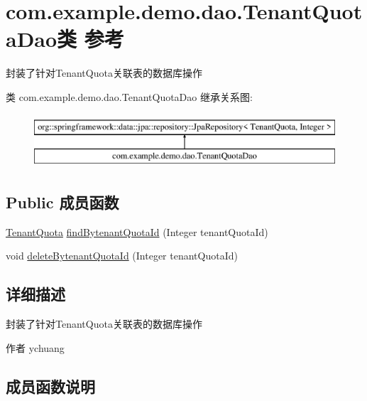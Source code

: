 \hypertarget{interfacecom_1_1example_1_1demo_1_1dao_1_1_tenant_quota_dao}{}\section{com.\+example.\+demo.\+dao.\+Tenant\+Quota\+Dao类 参考}
\label{interfacecom_1_1example_1_1demo_1_1dao_1_1_tenant_quota_dao}


封装了针对\+Tenant\+Quota关联表的数据库操作  


类 com.\+example.\+demo.\+dao.\+Tenant\+Quota\+Dao 继承关系图\+:\begin{figure}[H]
\begin{center}
\leavevmode
\includegraphics[height=2.000000cm]{interfacecom_1_1example_1_1demo_1_1dao_1_1_tenant_quota_dao}
\end{center}
\end{figure}
\subsection*{Public 成员函数}
\begin{DoxyCompactItemize}
\item 
\mbox{\hyperlink{classcom_1_1example_1_1demo_1_1modular_1_1_tenant_quota}{Tenant\+Quota}} \mbox{\hyperlink{interfacecom_1_1example_1_1demo_1_1dao_1_1_tenant_quota_dao_aae1ac7a929208d43ec54702caf4937e8}{find\+Bytenant\+Quota\+Id}} (Integer tenant\+Quota\+Id)
\item 
void \mbox{\hyperlink{interfacecom_1_1example_1_1demo_1_1dao_1_1_tenant_quota_dao_a47d4636e77670acb35729445930bcc3f}{delete\+Bytenant\+Quota\+Id}} (Integer tenant\+Quota\+Id)
\end{DoxyCompactItemize}


\subsection{详细描述}
封装了针对\+Tenant\+Quota关联表的数据库操作 

\begin{DoxyAuthor}{作者}
ychuang 
\end{DoxyAuthor}


\subsection{成员函数说明}
\mbox{\label{interfacecom_1_1example_1_1demo_1_1dao_1_1_tenant_quota_dao_a47d4636e77670acb35729445930bcc3f}} 
